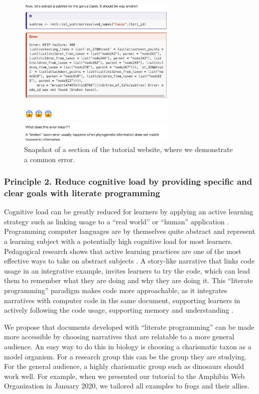 \documentclass[12pt]{article}
\begin{document}
\begin{figure}
\begin{center}
\includegraphics[width=3in]{fig-error.png}
\end{center}
\caption{Snapshot of a section of the tutorial website, where we demonstrate a common error. \label{fig:error}}
\end{figure}

\subsubsection*{Principle 2. Reduce cognitive load by providing specific and clear goals with literate programming}

Cognitive load can be greatly reduced for learners by applying an active learning strategy such as linking usage to a ``real world'' or ``human'' application \citep{felder2009active}.
Programming computer languages are by themselves quite abstract and represent a learning subject with a potentially high cognitive load for most learners.
Pedagogical research shows that active learning practices are one of the most effective ways to take on abstract subjects \citep{freeman2014active}.
A story-like narrative that links code usage in an integrative example, invites learners to try the code, which can lead them to remember what they are doing and why they are doing it.
This ``literate programming'' paradigm \citep{knuth1984literate, fritzson2002mathmodelica} makes code more approachable, as it integrates narratives with computer code in the same document, supporting learners in actively following the code usage, supporting memory and understanding \citep{piccolo2016tools}.

We propose that documents developed with ``literate programming'' can be made more accessible by choosing narratives that are relatable to a more general audience.
An easy way to do this in biology is choosing a charismatic taxon as a model organism.
For a research group this can be the group they are studying. For the general audience, a highly charismatic group such as dinosaurs should work well.
For example, when we presented our tutorial to the Amphibia Web Organization \citep{van2002amphibiaweb} in January 2020, we tailored all examples to frogs and their allies.
\end{document}
